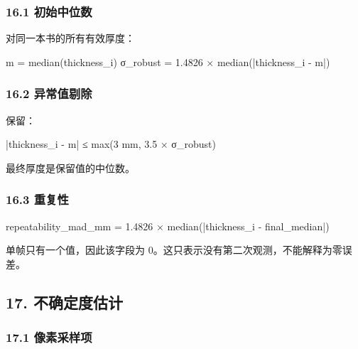 \documentclass[
  chinese,
  11pt,
  a4paper,
]{article}
\newenvironment{Shaded}{\begin{snugshade}}{\end{snugshade}}
\newcommand{\NormalTok}[1]{#1}
\begin{document}
\subsubsection{16.1
初始中位数}\label{161-ux521dux59cbux4e2dux4f4dux6570}

对同一本书的所有有效厚度：

\begin{Shaded}
\begin{Highlighting}[]
\NormalTok{m = median(thickness\_i)}
\NormalTok{σ\_robust = 1.4826 × median(|thickness\_i {-} m|)}
\end{Highlighting}
\end{Shaded}

\subsubsection{16.2
异常值剔除}\label{162-ux5f02ux5e38ux503cux5254ux9664}

保留：

\begin{Shaded}
\begin{Highlighting}[]
\NormalTok{|thickness\_i {-} m| ≤ max(3 mm, 3.5 × σ\_robust)}
\end{Highlighting}
\end{Shaded}

最终厚度是保留值的中位数。

\subsubsection{16.3 重复性}\label{163-ux91cdux590dux6027}

\begin{Shaded}
\begin{Highlighting}[]
\NormalTok{repeatability\_mad\_mm =}
\NormalTok{  1.4826 × median(|thickness\_i {-} final\_median|)}
\end{Highlighting}
\end{Shaded}

单帧只有一个值，因此该字段为
0。这只表示没有第二次观测，不能解释为零误差。

\subsection{17.
不确定度估计}\label{17-ux4e0dux786eux5b9aux5ea6ux4f30ux8ba1}

\subsubsection{17.1
像素采样项}\label{171-ux50cfux7d20ux91c7ux6837ux9879}
\end{document}
